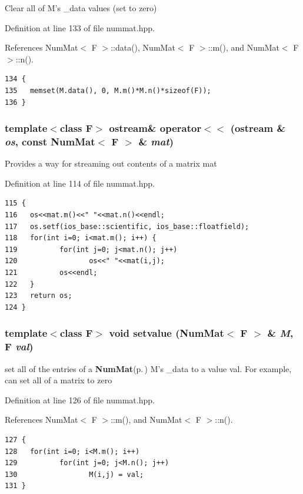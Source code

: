 Clear all of M's \_\-data values (set to zero) 

Definition at line 133 of file nummat.hpp.

References Num\-Mat$<$ F $>$::data(), Num\-Mat$<$ F $>$::m(), and Num\-Mat$<$ F $>$::n().

\footnotesize\begin{verbatim}134 {
135   memset(M.data(), 0, M.m()*M.n()*sizeof(F));
136 }
\end{verbatim}\normalsize 


\subsubsection{\setlength{\rightskip}{0pt plus 5cm}template$<$class F$>$ ostream\& operator$<$$<$ (ostream \& {\em os}, const {\bf Num\-Mat}$<$ F $>$ \& {\em mat})\hspace{0.3cm}{\tt  [inline]}}\label{nummat_8hpp_7121427878ef172c90e34a6e0bc9e4bc_7121427878ef172c90e34a6e0bc9e4bc}


Provides a way for streaming out contents of a matrix mat 

Definition at line 114 of file nummat.hpp.

\footnotesize\begin{verbatim}115 {
116   os<<mat.m()<<" "<<mat.n()<<endl;
117   os.setf(ios_base::scientific, ios_base::floatfield);
118   for(int i=0; i<mat.m(); i++) {
119          for(int j=0; j<mat.n(); j++)
120                 os<<" "<<mat(i,j);
121          os<<endl;
122   }
123   return os;
124 }
\end{verbatim}\normalsize 


\subsubsection{\setlength{\rightskip}{0pt plus 5cm}template$<$class F$>$ void setvalue ({\bf Num\-Mat}$<$ F $>$ \& {\em M}, F {\em val})\hspace{0.3cm}{\tt  [inline]}}\label{nummat_8hpp_a30cd53d0252eaa9877f7e78e982a3b6_a30cd53d0252eaa9877f7e78e982a3b6}


set all of the entries of a {\bf Num\-Mat}{\rm (p.\,\pageref{classNumMat})} M's \_\-data to a value val. For example, can set all of a matrix to zero 

Definition at line 126 of file nummat.hpp.

References Num\-Mat$<$ F $>$::m(), and Num\-Mat$<$ F $>$::n().

\footnotesize\begin{verbatim}127 {
128   for(int i=0; i<M.m(); i++)
129          for(int j=0; j<M.n(); j++)
130                 M(i,j) = val;
131 }
\end{verbatim}\normalsize 


